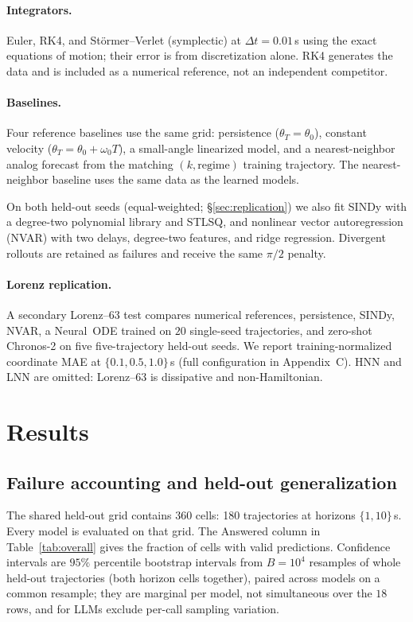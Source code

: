 \documentclass{article}
\begin{document}
\paragraph{Integrators.} Euler, RK4, and St\"ormer--Verlet (symplectic) at $\Delta
t{=}0.01$\,s using the exact equations of motion; their error is from discretization alone.
RK4 generates the data and is included as a numerical reference, not an independent
competitor.

\paragraph{Baselines.} Four reference baselines use the same grid: persistence
($\theta_T{=}\theta_0$), constant velocity ($\theta_T{=}\theta_0{+}\omega_0T$), a
small-angle linearized model, and a nearest-neighbor analog forecast from the matching
$(k,\mathrm{regime})$ training trajectory. The nearest-neighbor baseline uses the same data as the
learned models.

On both held-out seeds (equal-weighted; \S\ref{sec:replication}) we also fit SINDy
with a degree-two polynomial library and
STLSQ, and nonlinear vector autoregression (NVAR) with two delays, degree-two features, and
ridge regression. Divergent rollouts are retained as failures and receive the same $\pi/2$
penalty.

\paragraph{Lorenz replication.} A secondary Lorenz--63 test compares numerical references,
persistence, SINDy, NVAR, a Neural~ODE trained on $20$ single-seed trajectories, and zero-shot
Chronos-2 on five five-trajectory held-out seeds. We report training-normalized coordinate MAE at
$\{0.1,0.5,1.0\}$\,s (full configuration in Appendix~C). HNN and LNN are omitted:
Lorenz--63 is dissipative and non-Hamiltonian.

\section{Results}
\subsection{Failure accounting and held-out generalization}
\label{sec:reliability}
The shared held-out grid contains $360$ cells: 180 trajectories at horizons $\{1,10\}$\,s.
Every model is evaluated on that grid. The Answered column in Table~\ref{tab:overall} gives the
fraction of cells with valid predictions.
Confidence intervals are $95\%$ percentile bootstrap intervals from $B{=}10^4$ resamples of
whole held-out trajectories (both horizon cells together), paired across models on a common
resample; they are marginal per model, not simultaneous over the $18$ rows, and for LLMs
exclude per-call sampling variation.
\end{document}
